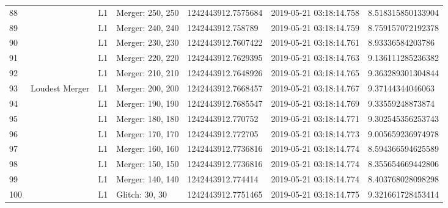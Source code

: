 \begin{longtable}{lllllll}
88   &                                                    &       L1 &  Merger: 250, 250 &  1242443912.7575684 &  2019-05-21 03:18:14.758 &   8.518315850133904 \\
89   &                                                    &       L1 &  Merger: 240, 240 &   1242443912.758789 &  2019-05-21 03:18:14.759 &   8.759157072192378 \\
90   &                                                    &       L1 &  Merger: 230, 230 &  1242443912.7607422 &  2019-05-21 03:18:14.761 &    8.93336584203786 \\
91   &                                                    &       L1 &  Merger: 220, 220 &  1242443912.7629395 &  2019-05-21 03:18:14.763 &   9.136111285236382 \\
92   &                                                    &       L1 &  Merger: 210, 210 &  1242443912.7648926 &  2019-05-21 03:18:14.765 &   9.363289301304844 \\
93   &                                     Loudest Merger &       L1 &  Merger: 200, 200 &  1242443912.7668457 &  2019-05-21 03:18:14.767 &    9.37144344046063 \\
94   &                                                    &       L1 &  Merger: 190, 190 &  1242443912.7685547 &  2019-05-21 03:18:14.769 &    9.33559248873874 \\
95   &                                                    &       L1 &  Merger: 180, 180 &   1242443912.770752 &  2019-05-21 03:18:14.771 &   9.302545356253743 \\
96   &                                                    &       L1 &  Merger: 170, 170 &   1242443912.772705 &  2019-05-21 03:18:14.773 &   9.005659236974978 \\
97   &                                                    &       L1 &  Merger: 160, 160 &  1242443912.7736816 &  2019-05-21 03:18:14.774 &   8.594366594625589 \\
98   &                                                    &       L1 &  Merger: 150, 150 &  1242443912.7736816 &  2019-05-21 03:18:14.774 &   8.355654669442806 \\
99   &                                                    &       L1 &  Merger: 140, 140 &   1242443912.774414 &  2019-05-21 03:18:14.774 &   8.403768028098298 \\
100  &                                                    &       L1 &    Glitch: 30, 30 &  1242443912.7751465 &  2019-05-21 03:18:14.775 &   9.321661728453414 \\

\end{longtable}
